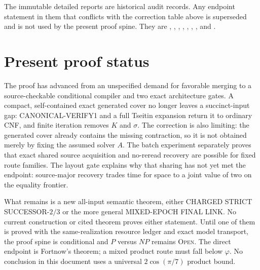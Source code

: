 \documentclass[11pt]{article}
\newcommand{\Open}{\textsc{Open}}
\begin{document}
The immutable detailed reports are historical audit records.  Any endpoint
statement in them that conflicts with the correction table above is
superseded and is not used by the present proof spine.  They are
,
,
,
,
,
,
,
and
.

\section{Present proof status}

The proof has advanced from an unspecified demand for favorable merging to a
source-checkable conditional compiler and two exact architecture gates.  A
compact, self-contained exact generated cover no longer leaves a
succinct-input gap: CANONICAL-VERIFY1 and a full Tseitin expansion return it
to ordinary CNF, and finite iteration removes $K$ and $\sigma$.  The
correction is also limiting: the generated cover already contains the
missing contraction, so it is not obtained merely by fixing the assumed
solver $A$.
The batch experiment separately proves that exact shared source acquisition
and no-reread recovery are possible for fixed route families.  The layout
gate explains why that sharing has not yet met the endpoint: source-major
recovery trades time for space to a joint value of two on the equality
frontier.

What remains is a new all-input semantic theorem, either CHARGED STRICT
SUCCESSOR-$2/3$ or the more general MIXED-EPOCH FINAL LINK.
No current construction or cited theorem proves either statement.  Until one
of them is proved with the same-realization resource ledger and exact model
transport, the proof spine is conditional and $P$ versus $NP$ remains
\Open.  The direct endpoint is Fortnow's theorem; a mixed product route must
fall below $\varphi$.  No conclusion in this document uses a universal
$2\cos(\pi/7)$ product bound.




\end{document}
